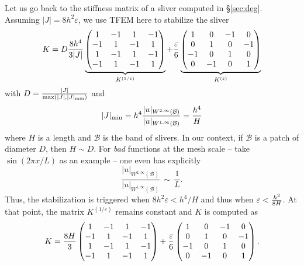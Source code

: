 \documentclass{article}
\def\WIi{W^{1,\infty}}
\def\WIIi{W^{2,\infty}}
\def\B{\mathcal{B}}
\begin{document}
Let us go back to the stiffness matrix of a sliver computed in \S\ref{sec:deg}. Assuming 
$|J| = 8 h^2 \varepsilon$, we use TFEM here to stabilize 
the sliver
\[
K = D 
\frac{ 8 h^4}{3 |J|} 
\underbrace{\begin{pmatrix}
1 & -1 & 1 & -1\\
-1& 1 & -1& 1 \\
1 & -1& 1 & -1\\
-1& 1 & -1& 1
\end{pmatrix}}_{K^{(1/\varepsilon)}}
+{\varepsilon \over 6}
\underbrace{
\begin{pmatrix}
1 & 0 & -1 & 0\\
0 & 1 & 0 & -1\\
-1& 0 & 1 & 0\\
0 & -1& 0 & 1
\end{pmatrix}}_{K^{(\varepsilon)}}
\]
with $D = {|J| \over \max(|J|,|J|_{\min})}$ and
\begin{align} \nonumber
        |J|_{\min} = h^4 \frac{|u|_{\WIIi(\B)}}{|u|_{\WIi(\B)}} = {h^4 \over H}
\end{align}
where
$H$ is a length and $\B$ is the band of slivers.
In our context, if $\mathcal B$ is a patch of diameter $D$,
then $H \sim D$. For \emph{bad} functions at the mesh scale -- take $\sin(2\pi x/L)$ as an example -- one even has explicitly
\[
\frac{|u|_{\WIIi(\B)}}{|u|_{\WIi(\B)}} 
\,\sim\, \frac{1}{L}.
\]
Thus, the stabilization is
triggered when $8h^2 \varepsilon < h^4/H$ and thus when $\varepsilon  < {h^2 \over 8 H}$. At that point, the
matrix $K^{(1/\varepsilon)}$ remains constant and $K$ is computed as
\[
K = 
\frac{8H}{3} 
\begin{pmatrix}
1 & -1 & 1 & -1\\
-1& 1 & -1& 1 \\
1 & -1& 1 & -1\\
-1& 1 & -1& 1
\end{pmatrix}
+{\varepsilon \over 6}
\begin{pmatrix}
1 & 0 & -1 & 0\\
0 & 1 & 0 & -1\\
-1& 0 & 1 & 0\\
0 & -1& 0 & 1
\end{pmatrix}.
\]
\end{document}
